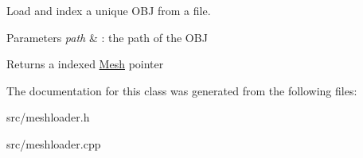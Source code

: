 Load and index a unique O\+BJ from a file. 


\begin{DoxyParams}{Parameters}
{\em path} & \+: the path of the O\+BJ \\
\hline
\end{DoxyParams}
\begin{DoxyReturn}{Returns}
a indexed \mbox{\hyperlink{class_mesh}{Mesh}} pointer 
\end{DoxyReturn}


The documentation for this class was generated from the following files\+:\begin{DoxyCompactItemize}
\item 
src/meshloader.\+h\item 
src/meshloader.\+cpp\end{DoxyCompactItemize}
